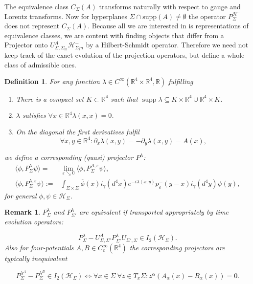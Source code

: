 \documentclass[a4paper,11pt]{article}
\newtheorem{de}{Definition}
\newtheorem{rmk}{Remark}
\newcommand{\supp}{\operatorname{supp}}
\begin{document}
The equivalence class \(C_\Sigma(A)\) transforms naturally with respect to gauge and Lorentz transforms\cite{ivp2}. 
Now for hyperplanes \(\Sigma\cap \text{supp}(A)\neq \emptyset\) the operator \(P^{\mathcal{H}^-}_{\Sigma} \) does not represent
\(C_\Sigma(A)\). Because all we are interested in is representations of equivalence classes, we are content with finding
objects that differ from a Projector onto \(U_{\Sigma,\Sigma_{\text{in}}}^A \mathcal{H}_{\Sigma_in}^-\) by a Hilbert-Schmidt operator.
Therefore we need not keep track of the exact evolution of the projection operators, but define a whole class of admissible ones.

\begin{de}\label{def:lambda}
For any function \(\lambda\in C^\infty (\mathbb{R}^4\times \mathbb{R}^4, \mathbb{R})\) fulfilling
\begin{enumerate}[label= \roman*) ]
\item There is a compact set \(K\subset \mathbb{R}^4\) such that \(\supp \lambda \subseteq K\times \mathbb{R}^4 \cup \mathbb{R}^4 \times K\).
\item \(\lambda\) satisfies \(\forall x \in \mathbb{R}^4 \lambda(x,x)=0\).
\item On the diagonal the first derivatives fulfil 
\begin{equation}
\forall x,y\in\mathbb{R}^4: \partial_x \lambda(x,y)=-\partial_y \lambda(x,y) = A(x),
\end{equation}
\end{enumerate}
we define a corresponding (quasi) projector \(P^\lambda\):
\begin{align}
\langle \phi, P^\lambda_\Sigma \psi\rangle =& \lim_{\varepsilon \searrow 0} \langle \phi, P^{A,\varepsilon}_\Sigma \psi\rangle ,\\
\langle \phi, P^{\lambda,\varepsilon}_\Sigma \psi\rangle :=&
\int_{\Sigma\times\Sigma}\overline{\phi}(x)i_\gamma(d^4x) 
e^{-i \lambda(x,y)} p^-_\varepsilon(y-x)i_\gamma(d^4y) \psi(y),
\end{align}
for general \(\phi, \psi \in \mathcal{H}_\Sigma\).
\end{de}

\begin{rmk}\label{main results of ivp2}
\(P_{\Sigma}^\lambda\) and \( P_{\Sigma'}^\lambda\) are equivalent if transported appropriately by time evolution operators\cite[theorem 2.8]{ivp2}:

\begin{equation}
P_{\Sigma}^\lambda-U_{\Sigma,\Sigma'}^A P_{\Sigma'}^\lambda U_{\Sigma',\Sigma}\in I_2(\mathcal{H}_\Sigma).
\end{equation}
Also for four-potentials \(A,B\in C_c^\infty(\mathbb{R}^4)\) 
the corresponding projectors are typically inequivalent\cite[theorem 1.5]{ivp2}

\begin{equation}\label{equiv:pLambda}
P_{\Sigma}^{\lambda^A} - P_{\Sigma}^{\lambda^B} \in I_2(\mathcal{H}_\Sigma) \iff \forall x\in \Sigma~ \forall z\in T_x \Sigma: z^\alpha(A_\alpha(x)-B_\alpha(x))=0.
\end{equation}
\end{rmk}
\end{document}
